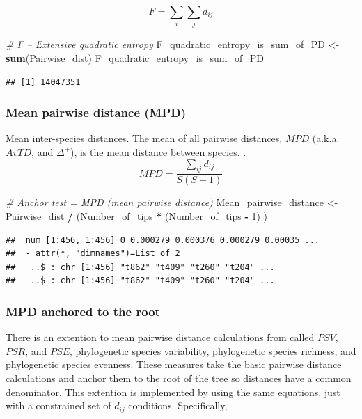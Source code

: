 \documentclass[]{book}
\newenvironment{Shaded}{\begin{snugshade}}{\end{snugshade}}
\newcommand{\KeywordTok}[1]{\textcolor[rgb]{0.13,0.29,0.53}{\textbf{{#1}}}}
\newcommand{\DecValTok}[1]{\textcolor[rgb]{0.00,0.00,0.81}{{#1}}}
\newcommand{\StringTok}[1]{\textcolor[rgb]{0.31,0.60,0.02}{{#1}}}
\newcommand{\CommentTok}[1]{\textcolor[rgb]{0.56,0.35,0.01}{\textit{{#1}}}}
\newcommand{\OperatorTok}[1]{\textcolor[rgb]{0.81,0.36,0.00}{\textbf{{#1}}}}
\newcommand{\NormalTok}[1]{{#1}}
\theoremstyle{definition}
\theoremstyle{definition}
\theoremstyle{remark}
\begin{document}
\[F = \sum_{i} \sum_{j} d_{ij}\]

\begin{Shaded}
\begin{Highlighting}[]
\CommentTok{# F -- Extensive quadratic entropy}
\NormalTok{F_quadratic_entropy_is_sum_of_PD <-}\StringTok{ }\KeywordTok{sum}\NormalTok{(Pairwise_dist)}
\NormalTok{F_quadratic_entropy_is_sum_of_PD}
\end{Highlighting}
\end{Shaded}

\begin{verbatim}
## [1] 14047351
\end{verbatim}

\subsubsection{Mean pairwise distance
(MPD)}\label{mean-pairwise-distance-mpd}

Mean inter-species distances. The mean of all pairwise distances,
\(MPD\) (a.k.a. \(AvTD\), and \(\Delta^{+}\)), is the mean distance
between species. \citep{Clarke1998, Webb2002, Webb2008, Kembel2010}.
\[MPD = \dfrac{\sum_{ij} d_{ij}}{S(S-1)}\]

\begin{Shaded}
\begin{Highlighting}[]
\CommentTok{# Anchor test = MPD (mean pairwise distance)}
\NormalTok{Mean_pairwise_distance <-}\StringTok{ }
\StringTok{  }\NormalTok{Pairwise_dist }\OperatorTok{/}\StringTok{ }\NormalTok{(Number_of_tips }\OperatorTok{*}\StringTok{ }\NormalTok{(Number_of_tips }\OperatorTok{-}\StringTok{ }\DecValTok{1}\NormalTok{) ) }
\end{Highlighting}
\end{Shaded}

\begin{verbatim}
##  num [1:456, 1:456] 0 0.000279 0.000376 0.000279 0.00035 ...
##  - attr(*, "dimnames")=List of 2
##   ..$ : chr [1:456] "t862" "t409" "t260" "t204" ...
##   ..$ : chr [1:456] "t862" "t409" "t260" "t204" ...
\end{verbatim}

\subsubsection{MPD anchored to the root}\label{mpd-anchored-to-the-root}

There is an extention to mean pairwise distance calculations from
\citet{Helmus2010} called \(PSV\), \(PSR\), and \(PSE\), phylogenetic
species variability, phylogenetic species richness, and phylogenetic
species evenness. These measures take the basic pairwise distance
calculations and anchor them to the root of the tree so distances have a
common denominator. This extention is implemented by using the same
equations, just with a constrained set of \(d_{ij}\) conditions.
Specifically,
\end{document}

